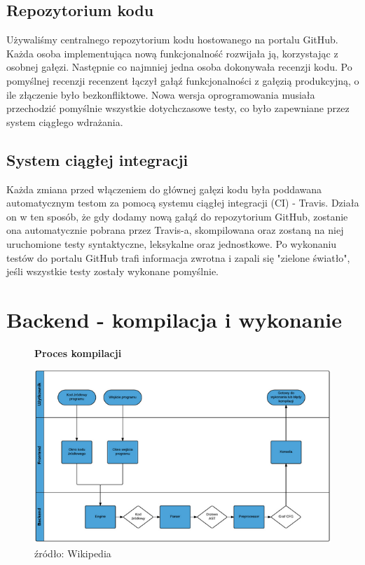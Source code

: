 \documentclass[a4paper,twoside,openright,11pt]{report}
\begin{document}
  \section{Repozytorium kodu}
\par Używaliśmy centralnego repozytorium kodu hostowanego na portalu GitHub. \cite{repozytorium} Każda osoba implementująca nową funkcjonalność rozwijała ją, korzystając z osobnej gałęzi. Następnie co najmniej jedna osoba dokonywała recenzji kodu. Po pomyślnej recenzji recenzent łączył gałąź funkcjonalności z gałęzią produkcyjną, o ile złączenie było bezkonfliktowe. Nowa wersja oprogramowania musiała przechodzić pomyślnie wszystkie dotychczasowe testy, co było zapewniane przez system ciągłego wdrażania. 

  \section{System ciągłej integracji}
\par Każda zmiana przed włączeniem do głównej gałęzi kodu była poddawana automatycznym testom za pomocą systemu ciągłej integracji (CI) - Travis. \cite{travis} Działa on w ten sposób, że gdy dodamy nową gałąź do repozytorium GitHub, zostanie ona automatycznie pobrana przez Travis-a, skompilowana oraz zostaną na niej uruchomione testy syntaktyczne, leksykalne oraz jednostkowe. Po wykonaniu testów do portalu GitHub trafi informacja zwrotna i zapali się "zielone światło", jeśli wszystkie testy zostały wykonane pomyślnie. 

  \chapter {Backend - kompilacja i wykonanie}
  
\begin{figure}[H]
  \centering
  \textbf{Proces kompilacji}\par\medskip
  \includegraphics[width=\textwidth]{flow}
  \caption{źródło: Wikipedia}
\end{figure}
\end{document}
